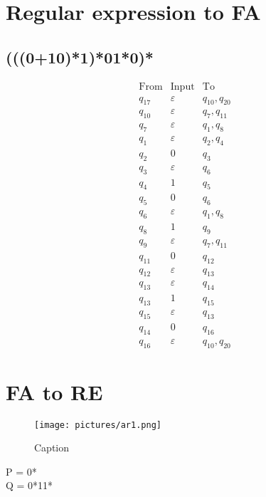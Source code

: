 \documentclass[8pt]{article}
\begin{document}
\section{Regular expression to FA}
\subsection{(((0+10)*1)*01*0)*}
\[
\begin{array}{c|c|c}
\text{From} & \text{Input} & \text{To} \\ \hline
q_{17} & \varepsilon & q_{10}, q_{20} \\
q_{10} & \varepsilon & q_{7}, q_{11} \\
q_{7} & \varepsilon & q_{1}, q_{8} \\
q_{1} & \varepsilon & q_{2}, q_{4} \\
q_{2} & 0 & q_{3} \\
q_{3} & \varepsilon & q_{6} \\
q_{4} & 1 & q_{5} \\
q_{5} & 0 & q_{6} \\
q_{6} & \varepsilon & q_{1}, q_{8} \\
q_{8} & 1 & q_{9} \\
q_{9} & \varepsilon & q_{7}, q_{11} \\
q_{11} & 0 & q_{12} \\
q_{12} & \varepsilon & q_{13} \\
q_{13} & \varepsilon & q_{14} \\
q_{13} & 1 & q_{15} \\
q_{15} & \varepsilon & q_{13} \\
q_{14} & 0 & q_{16} \\
q_{16} & \varepsilon & q_{10}, q_{20}
\end{array}
\]
\section{FA to RE}
\begin{figure}[H]
    \centering
    \texttt{[image: pictures/ar1.png]}
    \caption{Caption}
    \label{fig:placeholder}
\end{figure}
P = 0*\\
Q = 0*11*
\end{document}
